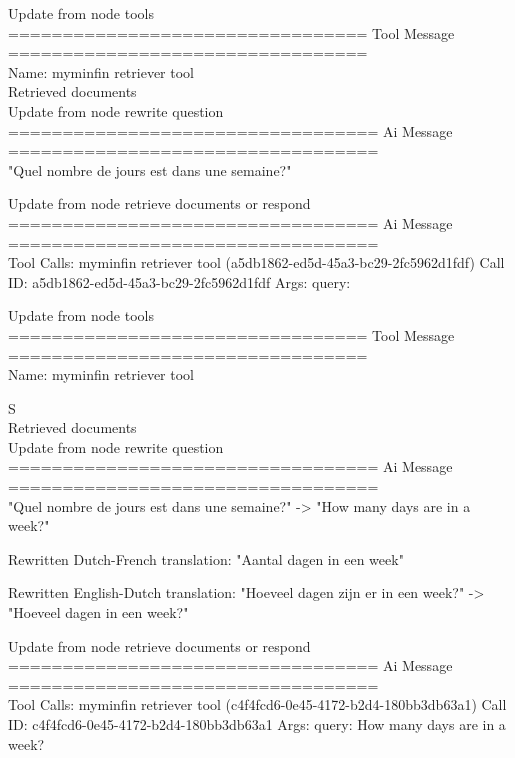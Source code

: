 Update from node tools
\\[1em]
================================= Tool Message =================================
\\[1em]
Name: myminfin  retriever  tool
\\[1em]
Retrieved documents
\\[1em]
Update from node rewrite  question
\\[1em]
================================== Ai Message ==================================
\\[1em]

"Quel nombre de jours est dans une semaine?"



Update from node retrieve  documents  or  respond
\\[1em]
================================== Ai Message ==================================
\\[1em]
Tool Calls:
myminfin  retriever  tool (a5db1862-ed5d-45a3-bc29-2fc5962d1fdf)
Call ID: a5db1862-ed5d-45a3-bc29-2fc5962d1fdf
Args:
query:



Update from node tools
\\[1em]
================================= Tool Message =================================
\\[1em]
Name: myminfin  retriever  tool

S\\[1em]
Retrieved documents
\\[1em]
Update from node rewrite  question
\\[1em]
================================== Ai Message ==================================
\\[1em]

"Quel nombre de jours est dans une semaine?" -> "How many days are in a week?"

Rewritten Dutch-French translation:
"Aantal dagen in een week"

Rewritten English-Dutch translation:
"Hoeveel dagen zijn er in een week?" -> "Hoeveel dagen in een week?"



Update from node retrieve  documents  or  respond
\\[1em]
================================== Ai Message ==================================
\\[1em]
Tool Calls:
myminfin  retriever  tool (c4f4fcd6-0e45-4172-b2d4-180bb3db63a1)
Call ID: c4f4fcd6-0e45-4172-b2d4-180bb3db63a1
Args:
query: How many days are in a week?



